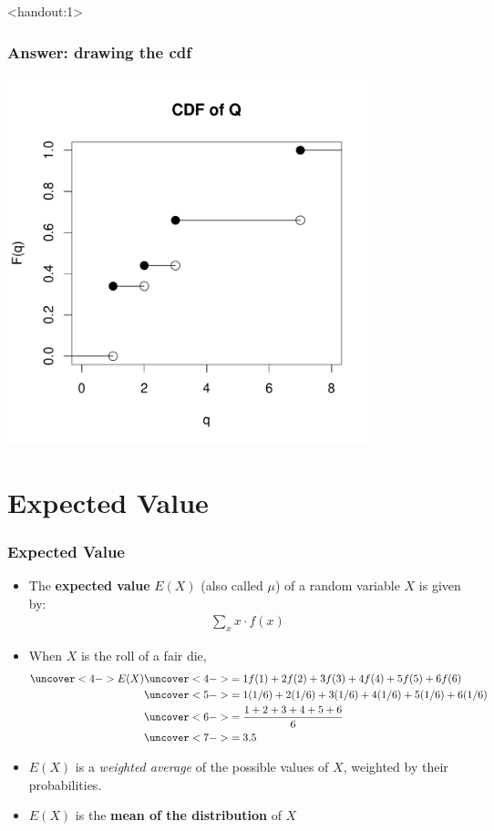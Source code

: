 \documentclass[handout]{beamer}\usepackage[]{graphicx}\usepackage[]{color}
\newenvironment{knitrout}{}{} %
\newcommand{\answers}{1}
\numberwithin{equation}{section}
\begin{document}
\begin{frame}<handout:\answers>
\frametitle{Answer: drawing the cdf}

\begin{knitrout}
\color{fgcolor}
\includegraphics[width=0.8\textwidth,height=0.8\textheight]{figure/unnamed-chunk-6-1} 

\end{knitrout}
\end{frame}

\section{Expected Value}


\begin{frame}
\frametitle{Expected Value} \small
\begin{itemize}
\pause \item The {\bf expected value} $E(X)$ (also called $\mu$) of a random variable $X$ is given by:
\begin{align*}
\sum_{x} x \cdot f(x)
\end{align*}
\pause \item When $X$ is the roll of a fair die,
\begin{align*}
\uncover<4->{E(X)} & \uncover<4->{= 1 f(1) + 2 f(2) + 3 f(3) + 4 f(4) + 5 f(5) + 6 f(6)} \\
& \uncover<5->{= 1 (1/6) + 2 (1/6) + 3 (1/6) + 4 (1/6) + 5 (1/6) + 6 (1/6)} \\ 
& \uncover<6->{= \frac{1+2+3+4+5+6}{6}} \\
& \uncover<7->{= 3.5}
\end{align*}
\pause \pause \pause \pause \pause \item $E(X)$ is a \emph{weighted average} of the possible values of $X$, weighted by their probabilities.
\pause \item $E(X)$ is the {\bf mean of the distribution} of $X$
\end{itemize}
\end{frame}
\end{document}
